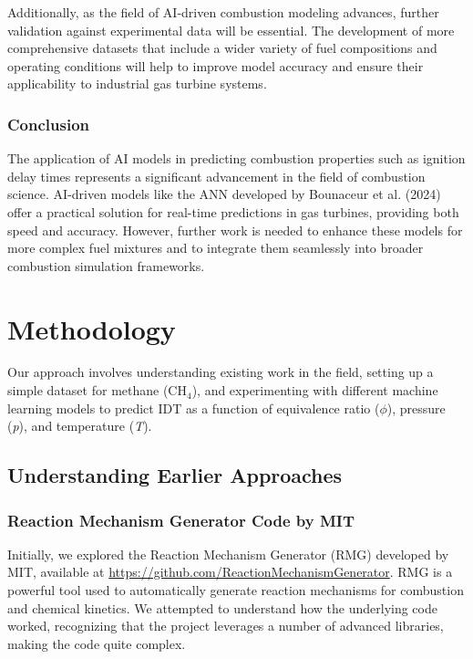 \documentclass[12pt]{report}
\begin{document}
Additionally, as the field of AI-driven combustion modeling advances, further validation against experimental data will be essential. The development of more comprehensive datasets that include a wider variety of fuel compositions and operating conditions will help to improve model accuracy and ensure their applicability to industrial gas turbine systems.

\subsection{Conclusion}
The application of AI models in predicting combustion properties such as ignition delay times represents a significant advancement in the field of combustion science. AI-driven models like the ANN developed by Bounaceur et al. (2024) offer a practical solution for real-time predictions in gas turbines, providing both speed and accuracy. However, further work is needed to enhance these models for more complex fuel mixtures and to integrate them seamlessly into broader combustion simulation frameworks.





\chapter{Methodology}

Our approach involves understanding existing work in the field, setting up a simple dataset for methane (CH\(_4\)), and experimenting with different machine learning models to predict IDT as a function of equivalence ratio (\(\phi\)), pressure (\textit{p}), and temperature (\textit{T}).

\section{Understanding Earlier Approaches}
\subsection{Reaction Mechanism Generator Code by MIT}

Initially, we explored the Reaction Mechanism Generator (RMG) developed by MIT, available at \url{https://github.com/ReactionMechanismGenerator}.
\newline
RMG is a powerful tool used to automatically generate reaction mechanisms for combustion and chemical kinetics. We attempted to understand how the underlying code worked, recognizing that the project leverages a number of advanced libraries, making the code quite complex.
\end{document}
